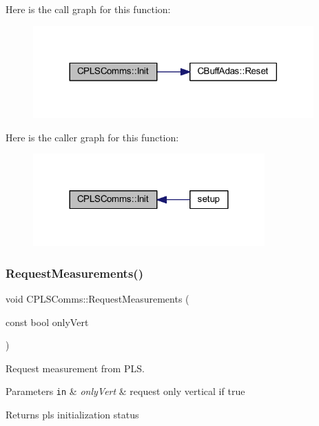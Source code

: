 Here is the call graph for this function\+:
\nopagebreak
\begin{figure}[H]
\begin{center}
\leavevmode
\includegraphics[width=305pt]{class_c_p_l_s_comms_ae7f8d87ea15de35a120d65a7a8bbbb76_cgraph}
\end{center}
\end{figure}
Here is the caller graph for this function\+:
\nopagebreak
\begin{figure}[H]
\begin{center}
\leavevmode
\includegraphics[width=252pt]{class_c_p_l_s_comms_ae7f8d87ea15de35a120d65a7a8bbbb76_icgraph}
\end{center}
\end{figure}
\mbox{\label{class_c_p_l_s_comms_ab69a49f5c4cd7b4b9f63fa16c7792920}} 
\subsubsection{\texorpdfstring{Request\+Measurements()}{RequestMeasurements()}}
{\footnotesize\ttfamily void C\+P\+L\+S\+Comms\+::\+Request\+Measurements (\begin{DoxyParamCaption}\item[{const bool}]{only\+Vert }\end{DoxyParamCaption})}



Request measurement from P\+LS. 


\begin{DoxyParams}[1]{Parameters}
\mbox{\tt in}  & {\em only\+Vert} & request only vertical if true \\
\hline
\end{DoxyParams}
\begin{DoxyReturn}{Returns}
pls initialization status 
\end{DoxyReturn}


